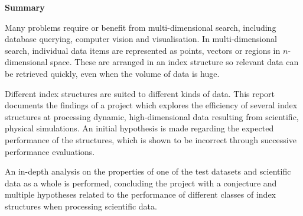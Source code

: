 \begin{center}
    {\LARGE\bf Summary}
\end{center}

Many problems require or benefit from multi-dimensional search, including database querying, computer vision and visualisation. In multi-dimensional search, individual data items are represented as points, vectors or regions in $n$-dimensional space. These are arranged in an index structure so relevant data can be retrieved quickly, even when the volume of data is huge.

Different index structures are suited to different kinds of data. This report documents the findings of a project which explores the efficiency of several index structures at processing dynamic, high-dimensional data resulting from scientific, physical simulations. An initial hypothesis is made regarding the expected performance of the structures, which is shown to be incorrect through successive performance evaluations.

An in-depth analysis on the properties of one of the test datasets and scientific data as a whole is performed, concluding the project with a conjecture and multiple hypotheses related to the performance of different classes of index structures when processing scientific data.
